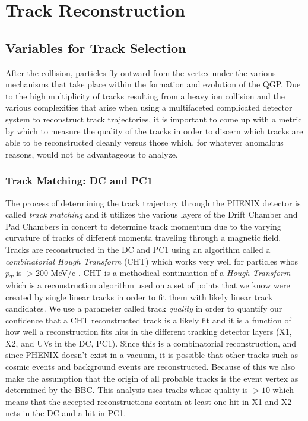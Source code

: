 \section{Track Reconstruction}
\label{trkrecosect}
\subsection{Variables for Track Selection}
After the collision, particles fly outward from the vertex under the various mechanisms that take place within the formation and evolution of the QGP. Due to the high multiplicity of tracks resulting from a heavy ion collision and the various complexities that arise when using a multifaceted complicated detector system to reconstruct track trajectories, it is important to come up with a metric by which to measure the quality of the tracks in order to discern which tracks are able to be reconstructed cleanly versus those which, for whatever anomalous reasons, would not be advantageous to analyze.
\subsubsection{Track Matching: DC and PC1}
The process of determining the track trajectory through the PHENIX detector is called \textit{track matching} and it utilizes the various layers of the Drift Chamber and Pad Chambers in concert to determine track momentum due to the varying curvature of tracks of different momenta traveling through a magnetic field. Tracks are reconstructed in the DC and PC1 using an algorithm called a \textit{combinatorial Hough Transform} (CHT) which works very well for particles whos $p_T$ is $>$200 MeV/c \citep{Mitchell:2002wu}. CHT is a methodical continuation of a \textit{Hough Transform} which is a reconstruction algorithm used on a set of points that we know were created by single linear tracks in order to fit them with likely linear track candidates\citep{OHLSSON199277}. We use a parameter called track \textit{quality} in order to quantify our confidence that a CHT reconstructed track is a likely fit and it is a function of how well a reconstruction fits hits in the different tracking detector layers (X1, X2, and UVs in the DC, PC1). Since this is a combinatorial reconstruction, and since PHENIX doesn't exist in a vacuum, it is possible that other tracks such as cosmic events and background events are reconstructed.  Because of this we also make the assumption that the origin of all probable tracks is the event vertex as determined by the BBC. This analysis uses tracks whose quality is $>10$ which means that the accepted reconstructions contain at least one hit in X1 and X2 nets in the DC and a hit in PC1.

